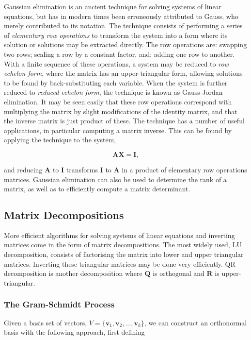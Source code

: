 \documentclass[11pt]{amsart}
\begin{document}
Gaussian elimination is an ancient technique for solving systems of linear equations, but has in modern times been erroneously attributed to Gauss, who merely contributed to its notation. The technique consists of performing a series of \emph{elementary row operations} to transform the system into a form where its solution or solutions may be extracted directly. The row operations are: swapping two rows; scaling a row by a constant factor, and; adding one row to another. With a finite sequence of these operations, a system may be reduced to \emph{row echelon form}, where the matrix has an upper-triangular form, allowing solutions to be found by back-substituting each variable. When the system is further reduced to \emph{reduced echelon form}, the technique is known as Gauss-Jordan elimination. It may be seen easily that these row operations correspond with multiplying the matrix by slight modifications of the identity matrix, and that the inverse matrix is just product of these. The technique has a number of useful applications, in particular computing a matrix inverse. This can be found by applying the technique to the system,

$$\mathbf{A}\mathbf{X} = \mathbf{I},$$

and reducing $\mathbf{A}$ to $\mathbf{I}$ transforms $\mathbf{I}$ to $\mathbf{A}$ in a product of elementary row operations matrices. Gaussian elimination can also be used to determine the rank of a matrix, as well as to efficiently compute a matrix determinant.

\subsection{Matrix Decompositions}

More efficient algorithms for solving systems of linear equations and inverting matrices come in the form of matrix decompositions. The most widely used, LU decomposition, consists of factorising the matrix into lower and upper triangular matrices. Inverting these triangular matrices may be done very efficiently. QR decomposition is another decomposition where $\mathbf{Q}$ is orthogonal and $\mathbf{R}$ is upper-triangular.

\subsubsection{The Gram-Schmidt Process}

Given a basis set of vectors, $V = \{\mathbf{v}_1, \mathbf{v}_2, \dots, \mathbf{v}_k\}$, we can construct an orthonormal basis with the following approach, first defining
\end{document}
